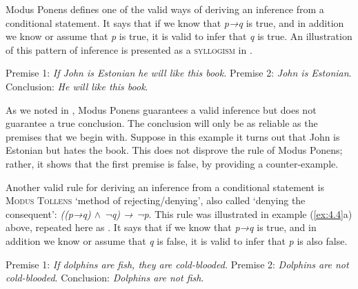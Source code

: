 
Modus Ponens defines one of the valid ways of deriving an inference from a conditional statement. It says that if we know that \textit{p→q} is true, and in addition we know or assume that \textit{p} is true, it is valid to infer that \textit{q} is true. An illustration of this pattern of inference is presented as a \textsc{syllogism} in .


\ea \label{ex:4.17}
Premise 1: \textit{If John is Estonian he will like this book.}   
Premise 2: \textit{John is Estonian}.    
\FelixHRule
Conclusion: \textit{He will like this book}.   
\z


As we noted in , Modus Ponens guarantees a valid inference but does not guarantee a true conclusion. The conclusion will only be as reliable as the premises that we begin with. Suppose in this example it turns out that John is Estonian but hates the book. This does not disprove the rule of Modus Ponens; rather, it shows that the first premise is false, by providing a counter-example.



Another valid rule for deriving an inference from a conditional statement is \textsc{Modus Tollens} ‘method of rejecting/denying’, also called ‘denying the consequent’: \textit{((p→q) $\wedge$ ¬q) → ¬p}. This rule was illustrated in example (\ref{ex:4.4}a) above, repeated here as . It says that if we know that \textit{p→q} is true, and in addition we know or assume that \textit{q} is false, it is valid to infer that \textit{p} is also false.

\settowidth{}
\ea \label{ex:4.18}
Premise 1: \textit{If dolphins are fish, they are cold-blooded.} 
Premise 2: \textit{Dolphins are not cold-blooded}.   
\FelixHRule
Conclusion: \textit{Dolphins are not fish}.   
\z


